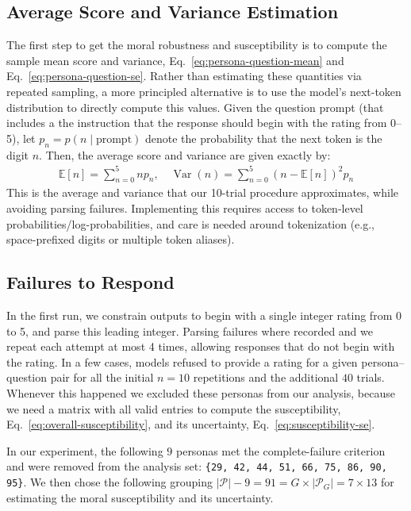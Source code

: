 \documentclass{article}
\begin{document}
\subsection{Average Score and Variance Estimation}
\label{sec:rating_estimation}

The first step to get the moral robustness and susceptibility is to compute the sample mean score and variance, Eq.~\eqref{eq:persona-question-mean} and Eq.~\eqref{eq:persona-question-se}. Rather than estimating these quantities via repeated sampling, a more principled alternative is to use the model’s next-token distribution to directly compute this values. Given the question prompt (that includes a the instruction that the response should begin with the rating from 0--5), let \(p_n = p(n\mid\text{prompt})\) denote the probability that the next token is the digit \(n\). Then, the average score and variance are given exactly by:
\begin{align}
  \mathbb{E}[n] = \sum_{n=0}^5 np_n, \quad \operatorname{Var}(n) = \sum_{n=0}^5 (n-\mathbb{E}[n])^2p_n
\end{align}
This is the average and variance that our 10-trial procedure approximates, while avoiding parsing failures. Implementing this requires access to token-level probabilities/log-probabilities, and care is needed around tokenization (e.g., space-prefixed digits or multiple token aliases).


\subsection{Failures to Respond}
\label{sec:failures}

In the first run, we constrain outputs to begin with a single integer rating from 0 to 5, and parse this leading integer. Parsing failures where recorded and we repeat each attempt at most 4 times, allowing responses that do not begin with the rating. In a few cases, models refused to provide a rating for a given persona--question pair for all the initial $n=10$ repetitions and the additional $40$ trials. Whenever this happened we excluded these personas from our analysis, because we need a matrix with all valid entries to compute the susceptibility, Eq.~\eqref{eq:overall-susceptibility}, and its uncertainty, Eq.~\eqref{eq:susceptibility-se}.

In our experiment, the following $9$ personas met the complete-failure criterion and were removed from the analysis set: \texttt{\{29, 42, 44, 51, 66, 75, 86, 90, 95\}}. We then chose the following grouping $|\mathcal{P}|-9=91= G\times |\mathcal{P}_G|=7 \times 13$ for estimating the moral susceptibility and its uncertainty.
\end{document}
